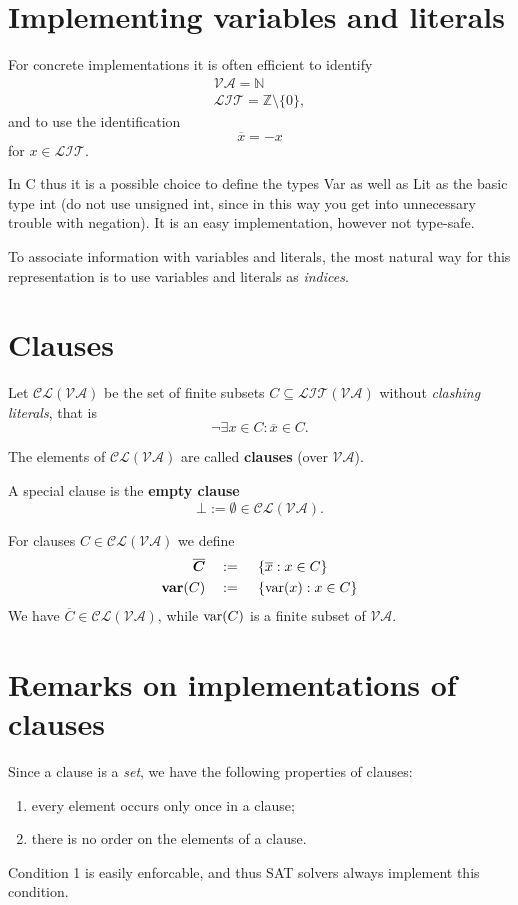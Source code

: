 \documentclass{article}
\def\mva{{\mathcal{VA}}}
\def\mcl{{\mathcal{CL}}}
\def\mlit{{\mathcal{LIT}}}
\def\pmva{{\pmb{\mathcal{VA}}}}
\def\pmcl{{\pmb{\mathcal{CL}}}}
\def\var{{\rm var}}
\def\bvar{{\bf var}}
\def\q{{\quad}}
\begin{document}
\section{Implementing variables and literals}%

For concrete implementations it is often efficient to identify
\begin{eqnarray*}
&\mva = \mathbb{N}&\\
&\mlit = \mathbb{Z}\setminus \{0\}, &
\end{eqnarray*}
and to use the identification
\[
\overline{x} = -x
\]
for $x \in \mlit$.

In C thus it is a possible choice to define the types Var as well as Lit as the basic type int (do not use unsigned int, since in this way you get into unnecessary trouble with negation). It is an easy implementation, however not type-safe.

To associate information with variables and literals, the most natural way for this representation is to use variables and literals as \textit{indices}.


\section{Clauses}%

Let $\pmcl(\pmva)$ be the set of finite subsets $C\subseteq \mlit(\mva)$ without \textit{clashing literals}, that is
\[
\neg \exists x\in C : \overline{x} \in C.
\]

The elements of $\mcl(\mva)$ are called \textbf{clauses} (over $\mva$).

A special clause is the \textbf{empty clause}
\[
\bot := \emptyset \in \mcl(\mva).
\]

For clauses $C\in \mcl(\mva)$ we define
\begin{align*}
\overline{{\bm C}} & \q :=  \q \left\{\overline{x} : x\in C\right\} \\
\bvar (C) & \q :=  \q \left\{\var (x) : x\in C\right\}
\end{align*}
We have $\overline{C} \in \mcl(\mva)$, while $\var(C)$ is a finite subset of $\mva$.

\section{Remarks on implementations of clauses}%

Since a clause is a \textit{set}, we have the following properties of clauses:
\begin{enumerate}
\item every element occurs only once in a clause;
\item there is no order on the elements of a clause.
\end{enumerate}
Condition 1 is easily enforcable, and thus SAT solvers always implement this condition.
\end{document}
